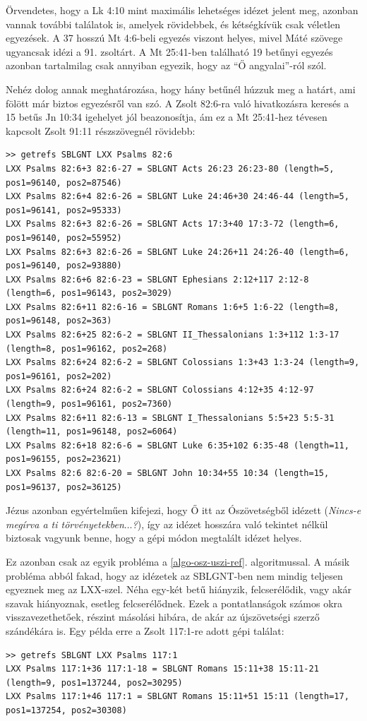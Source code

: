 \documentclass{article}
\begin{document}
Örvendetes, hogy a Lk 4:10 mint maximális lehetséges idézet jelent meg, azonban vannak további találatok is,
amelyek rövidebbek, és kétségkívük csak véletlen egyezések. A 37 hosszú Mt 4:6-beli egyezés viszont
helyes, mivel Máté szövege ugyancsak idézi a 91. zsoltárt. A Mt 25:41-ben található 19
betűnyi egyezés azonban tartalmilag csak annyiban egyezik, hogy az ``Ő angyalai''-ról szól.

Nehéz dolog annak meghatározása, hogy hány betűnél húzzuk meg a határt, ami fölött már biztos
egyezésről van szó. A Zsolt 82:6-ra való hivatkozásra keresés a 15 betűs Jn 10:34 igehelyet
jól beazonosítja, ám ez a Mt 25:41-hez tévesen kapcsolt Zsolt 91:11 részszövegnél rövidebb:
\begin{lstlisting}
>> getrefs SBLGNT LXX Psalms 82:6
LXX Psalms 82:6+3 82:6-27 = SBLGNT Acts 26:23 26:23-80 (length=5, pos1=96140, pos2=87546)
LXX Psalms 82:6+4 82:6-26 = SBLGNT Luke 24:46+30 24:46-44 (length=5, pos1=96141, pos2=95333)
LXX Psalms 82:6+3 82:6-26 = SBLGNT Acts 17:3+40 17:3-72 (length=6, pos1=96140, pos2=55952)
LXX Psalms 82:6+3 82:6-26 = SBLGNT Luke 24:26+11 24:26-40 (length=6, pos1=96140, pos2=93880)
LXX Psalms 82:6+6 82:6-23 = SBLGNT Ephesians 2:12+117 2:12-8 (length=6, pos1=96143, pos2=3029)
LXX Psalms 82:6+11 82:6-16 = SBLGNT Romans 1:6+5 1:6-22 (length=8, pos1=96148, pos2=363)
LXX Psalms 82:6+25 82:6-2 = SBLGNT II_Thessalonians 1:3+112 1:3-17 (length=8, pos1=96162, pos2=268)
LXX Psalms 82:6+24 82:6-2 = SBLGNT Colossians 1:3+43 1:3-24 (length=9, pos1=96161, pos2=202)
LXX Psalms 82:6+24 82:6-2 = SBLGNT Colossians 4:12+35 4:12-97 (length=9, pos1=96161, pos2=7360)
LXX Psalms 82:6+11 82:6-13 = SBLGNT I_Thessalonians 5:5+23 5:5-31 (length=11, pos1=96148, pos2=6064)
LXX Psalms 82:6+18 82:6-6 = SBLGNT Luke 6:35+102 6:35-48 (length=11, pos1=96155, pos2=23621)
LXX Psalms 82:6 82:6-20 = SBLGNT John 10:34+55 10:34 (length=15, pos1=96137, pos2=36125)
\end{lstlisting}
Jézus azonban egyértelműen kifejezi, hogy Ő itt az Ószövetségből idézett (\textit{Nincs-e
megírva a ti törvényetekben$\ldots$?}), így az idézet hosszára való tekintet
nélkül biztosak vagyunk benne, hogy a gépi módon megtalált idézet helyes.

Ez azonban csak az egyik probléma a \ref{algo-osz-uszi-ref}. algoritmussal.
A másik probléma abból fakad, hogy az idézetek az SBLGNT-ben nem mindig teljesen egyeznek meg
az LXX-szel. Néha egy-két betű hiányzik, felcserélődik, vagy akár szavak hiányoznak, esetleg
felcserélődnek. Ezek a pontatlanságok számos okra visszavezethetőek, részint másolási
hibára, de akár az újszövetségi szerző szándékára is.
Egy példa erre a Zsolt 117:1-re adott gépi találat:
\begin{lstlisting}
>> getrefs SBLGNT LXX Psalms 117:1
LXX Psalms 117:1+36 117:1-18 = SBLGNT Romans 15:11+38 15:11-21 (length=9, pos1=137244, pos2=30295)
LXX Psalms 117:1+46 117:1 = SBLGNT Romans 15:11+51 15:11 (length=17, pos1=137254, pos2=30308)
\end{lstlisting}
\end{document}
